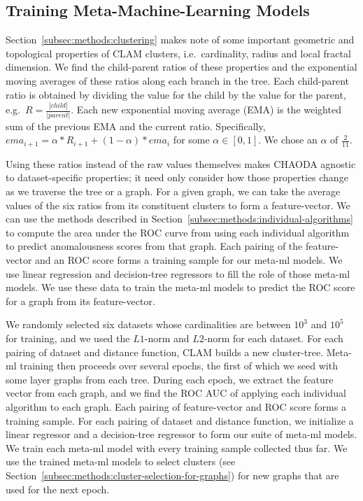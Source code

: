 \subsection{Training Meta-Machine-Learning Models}
\label{subsec:methods:training-meta-ml-models}

Section~\ref{subsec:methods:clustering} makes note of some important geometric and topological properties of CLAM clusters, i.e.\ cardinality, radius and local fractal dimension.
We find the child-parent ratios of these properties and the exponential moving averages of these ratios along each branch in the tree.
Each child-parent ratio is obtained by dividing the value for the child by the value for the parent, e.g.\ $R= \frac{|child|}{|parent|}$.
Each new exponential moving average (EMA) is the weighted sum of the previous EMA and the current ratio.
Specifically, $ema_{i+1} = \alpha * R_{i + 1} + (1 - \alpha) * ema_i$ for some $\alpha \in [0, 1]$.
We chose an $\alpha$ of $\frac{2}{11}$.

Using these ratios instead of the raw values themselves makes CHAODA agnostic to dataset-specific properties; it need only consider how those properties change as we traverse the tree or a graph.
For a given graph, we can take the average values of the six ratios from its constituent clusters to form a feature-vector.
We can use the methods described in Section~\ref{subsec:methods:individual-algorithms} to compute the area under the ROC curve from using each individual algorithm to predict anomalousness scores from that graph.
Each pairing of the feature-vector and an ROC score forms a training sample for our meta-ml models.
We use linear regression and decision-tree regressors to fill the role of those meta-ml models.
We use these data to train the meta-ml models to predict the ROC score for a graph from its feature-vector.

We randomly selected six datasets whose cardinalities are between $10^3$ and $10^5$ for training, and we used the $L1$-norm and $L2$-norm for each dataset.
For each pairing of dataset and distance function, CLAM builds a new cluster-tree.
Meta-ml training then proceeds over several epochs, the first of which we seed with some layer graphs from each tree.
During each epoch, we extract the feature vector from each graph, and we find the ROC AUC of applying each individual algorithm to each graph.
Each pairing of feature-vector and ROC score forms a training sample.
For each pairing of dataset and distance function, we initialize a linear regressor and a decision-tree regressor to form our suite of meta-ml models.
We train each meta-ml model with every training sample collected thus far.
We use the trained meta-ml models to select clusters (see Section~\ref{subsec:methods:cluster-selection-for-graphs}) for new graphs that are used for the next epoch.

